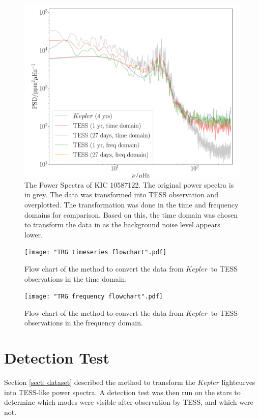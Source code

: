 \documentclass[a4paper,fleqn,usenatbib,useAMS]{mnras}
\newcommand{\kep}{\ensuremath{Kepler}\:}
\begin{document}
\begin{figure}
	\centering
	\includegraphics[scale=0.3]{diagnostic_plot2_full}
	\caption{The Power Spectra of KIC 10587122. The original power spectra is in grey. The data was transformed into TESS observation and overplotted. The transformation was done in the time and frequency domains for comparison. Based on this, the time domain was chosen to transform the data in as the background noise level appears lower.}	
	\label{overplotted PS}
\end{figure} 


\onecolumn
\begin{figure}
	\centering
	\texttt{[image: "TRG timeseries flowchart".pdf]}
	\caption{Flow chart of the method to convert the data from \kep \ to TESS observations in the time domain.}	
	\label{ts flowchart}
\end{figure} 

\begin{figure}
	\centering
	\texttt{[image: "TRG frequency flowchart".pdf]}
	\caption{Flow chart of the method to convert the data from \kep \ to TESS observations in the frequency domain.}	
	\label{fr flowchart}
\end{figure}
\newpage
\twocolumn



\section{Detection Test}
\label{sect: det_test}

Section \ref{sect: dataset} described the method to transform the $Kepler$ lightcurves into TESS-like power spectra. A detection test was then run on the stars to determine which modes were visible after observation by TESS, and which were not.
\end{document}
